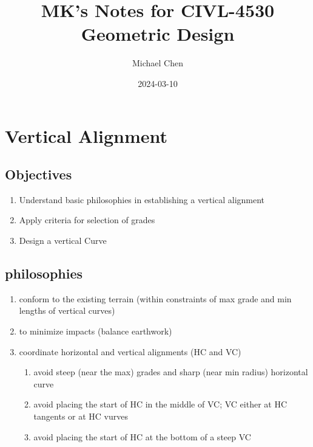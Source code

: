 \documentclass{article}
\title{MK's Notes for CIVL-4530 Geometric Design}
\date{2024-03-10}
\author{Michael Chen}
\begin{document}
  \setcounter{section}{4}



  \section{Vertical Alignment}
  \subsection{Objectives}
  \begin{enumerate}
    \item Understand basic philosophies in establishing a vertical alignment 
    \item Apply criteria for selection of grades
    \item Design a vertical Curve
  \end{enumerate}

  \subsection{philosophies}
  \begin{enumerate}
    \item conform to the existing terrain (within constraints of max grade and min lengths of vertical curves)
    \item to minimize impacts (balance earthwork)
    \item coordinate horizontal and vertical alignments (HC and VC)
    \begin{enumerate}
      \item avoid steep (near the max) grades and sharp (near min radius) horizontal curve
      \item avoid placing the start of HC in the middle of VC; VC either at HC tangents or at HC vurves 
      \item avoid placing the start of HC at the bottom of a steep VC
    \end{enumerate}
  \end{enumerate}
\end{document}

